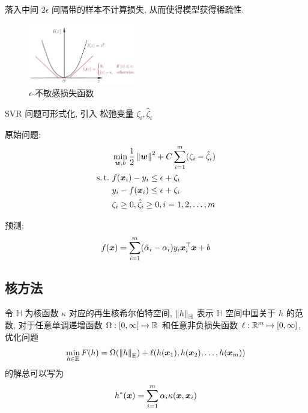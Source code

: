 落入中间 $2\epsilon$ 间隔带的样本不计算损失, 从而使得模型获得稀疏性.

\begin{figure}[!htb]
    \centering
    \includegraphics[width=0.42\textwidth]{pic/ML6/不敏感损失函数}
    \caption{$\epsilon$-不敏感损失函数}
\end{figure}

SVR 问题可形式化, 引入 松弛变量 $\zeta_i, \hat{\zeta}_i$

原始问题:
\begin{align*}
    &\min_{\bw,b}\frac{1}{2}\norm{\bw}^2+C\sum_{i=1}^m(\zeta_i-\hat{\zeta}_i)\\
    \st& f(\bx_i)-y_i\le \epsilon+\zeta_i\\
    &y_i-f(\bx_i)\le \epsilon+\zeta_i\\
    &\zeta_i\ge0, \hat{\zeta}_i\ge0,i=1,2,\dots,m
\end{align*}

预测:
\begin{align*}
    f(\bm{x})=\sum_{i=1}^m(\hat{\alpha}_i-\alpha_i)y_i\bm{x}_i^\top\bm{x}+b
\end{align*}

\subsection{核方法}
\begin{theorem}[表示定理]
    令 $\mathbb{H}$ 为核函数 $\kappa$ 对应的再生核希尔伯特空间, $\left\lVert h\right\rVert_{\mathbb{H}}$ 表示 $\mathbb{H}$ 空间中国关于 $h$ 的范数, 对于任意单调递增函数 $\Omega:[0,\infty]\mapsto \mathbb{R}$ 和任意非负损失函数 $\ell : \mathbb{R}^m\mapsto [0,\infty]$, 优化问题
    \begin{align*}
        \min_{h\in\mathbb{H}} F(h)=\Omega(\left\lVert h\right\rVert_{\mathbb{H}})+\ell(h(\bm{x}_1), h(\bm{x}_2),\dots,h(\bm{x}_m))
    \end{align*}
    的解总可以写为
    \begin{align*}
        h^*(\bm{x})=\sum_{i=1}^m\alpha_i\kappa(\bm{x},\bm{x}_i)
    \end{align*}
\end{theorem}


